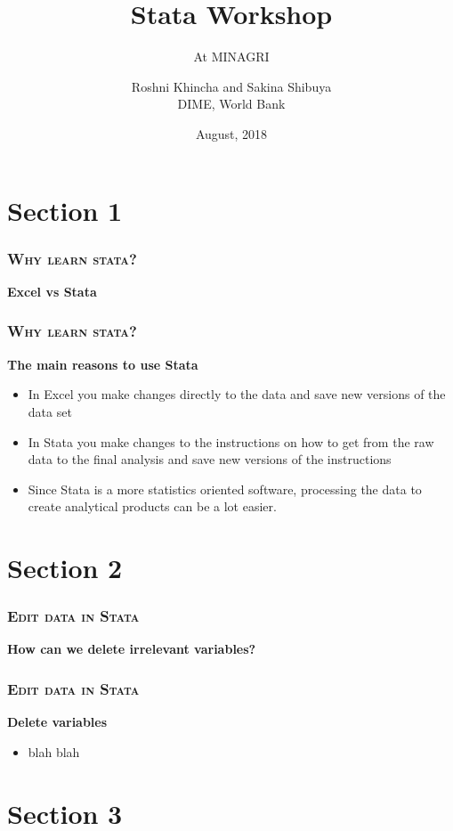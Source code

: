 \documentclass[10pt]{beamer}
\title{Stata Workshop} %
\subtitle{At MINAGRI} %
\author{Roshni Khincha and Sakina Shibuya \\ DIME, World Bank}
\date{August, 2018}
\begin{document}
		
	\maketitle

	\section{Section 1}

	\begin{frame}
	\frametitle{\textsc{Why learn stata?}}
	\begin{center}
		\textbf{Excel vs Stata} \\ 
	\end{center}
	\end{frame}

	\begin{frame}
	\frametitle{\textsc{Why learn stata?}}
	\begin{center}
		\Large\textbf{The main reasons to use Stata}
	\end{center}
	\begin{itemize}
		\item In Excel you make changes directly to the data and save new versions of the data set
		
		\item In Stata you make changes to the instructions on how to get from the raw data to the final analysis and save new versions of the instructions
		
		\item Since Stata is a more statistics oriented software, processing the data to create analytical products can be a lot easier. 
		
	\end{itemize}
	\end{frame}

	\section{Section 2}

	\begin{frame}
	\frametitle{\textsc{Edit data in Stata}}
		\begin{center}
			\textbf{How can we delete irrelevant variables?}
		\end{center}
	\end{frame}

	\begin{frame}[fragile]
	\frametitle{\textsc{Edit data in Stata}}
		\begin{center}
			\Large\textbf{Delete variables}
		\end{center}
		\begin{itemize}
			\item blah blah
		\end{itemize}
\begin{stlog}\end{stlog}
	\end{frame}


	\section{Section 3}

	
\end{document}

